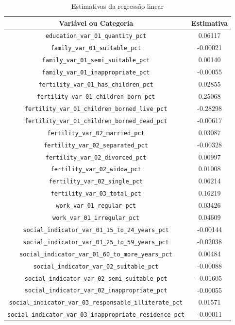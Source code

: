 \begin{table}[h]
\centering
\caption{Estimativas da regressão linear}
\label{tab:cap3_estimativa_reg_lin}
\begin{adjustbox}{width=\textwidth}
\begin{tabular}{cc}
Variável ou Categoria & Estimativa \\
\hline
\verb|education_var_01_quantity_pct| &  0.06117 \\
\verb|family_var_01_suitable_pct|  & -0.00021 \\
\verb|family_var_01_semi_suitable_pct| &  0.00140 \\
\verb|family_var_01_inappropriate_pct|  & -0.00055 \\
\verb|fertility_var_01_has_children_pct| &  0.02855 \\
\verb|fertility_var_01_children_born_pct| &  0.25068 \\
\verb|fertility_var_01_children_borned_live_pct|  & -0.28298 \\
\verb|fertility_var_01_children_borned_dead_pct|  & -0.00617 \\
\verb|fertility_var_02_married_pct| &  0.03087 \\
\verb|fertility_var_02_separated_pct|  & -0.00328 \\
\verb|fertility_var_02_divorced_pct| &  0.00997 \\
\verb|fertility_var_02_widow_pct| &  0.01008 \\
\verb|fertility_var_02_single_pct| &  0.06214 \\
\verb|fertility_var_03_total_pct| &  0.16219 \\
\verb|work_var_01_regular_pct| &  0.03426 \\
\verb|work_var_01_irregular_pct| &  0.04609 \\
\verb|social_indicator_var_01_15_to_24_years_pct|  & -0.00144 \\
\verb|social_indicator_var_01_25_to_59_years_pct|  & -0.02038 \\
\verb|social_indicator_var_01_60_to_more_years_pct| &  0.00484 \\
\verb|social_indicator_var_02_suitable_pct|  & -0.00088 \\
\verb|social_indicator_var_02_semi_suitable_pct|  & -0.01605 \\
\verb|social_indicator_var_02_inappropriate_pct|  & -0.00055 \\
\verb|social_indicator_var_03_responsable_illiterate_pct| &  0.01571 \\
\verb|social_indicator_var_03_inappropriate_residence_pct|  & -0.00011 \\

\end{tabular}
\end{adjustbox}
\end{table}
